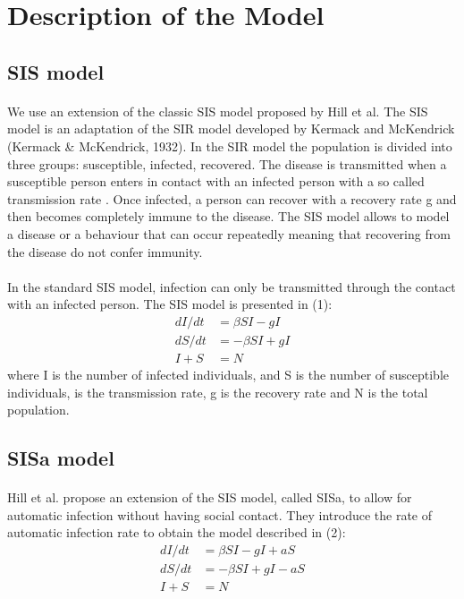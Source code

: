 \documentclass[11pt]{article}
\begin{document}
\section{Description of the Model}

\subsection{SIS model}
\paragraph{}
We use an extension of the classic SIS model proposed by Hill et al. The SIS model is an adaptation of the SIR model developed by Kermack and McKendrick (Kermack \& McKendrick, 1932). In the SIR model the population is divided into three groups: susceptible, infected, recovered. The disease is transmitted when a susceptible person enters in contact with an infected person with a so called transmission rate \beta \]. Once infected, a person can recover with a recovery rate g and then becomes completely immune to the disease. The SIS model allows to model a disease or a behaviour that can occur repeatedly meaning that recovering from the disease do not confer immunity.

\paragraph{}

In the standard SIS model, infection can only be transmitted through the contact with an infected person. The SIS model is presented in (1):
\begin{align}
      dI/dt  & =  \beta SI-gI \nonumber\\
      dS/dt   & =  -\beta SI+gI \\ 
      I+S & =  N \nonumber
\end{align}
where I is the number of infected individuals, and S is the number of susceptible individuals, \beta \] is the transmission rate, g is the recovery rate and N is the total population. 

\subsection{SISa model}
\paragraph{}
Hill et al. propose an extension of the SIS model, called SISa, to allow for automatic infection without having social contact. They introduce the rate of automatic infection rate  to obtain the model described in (2):
\begin{align}
      dI/dt  & =  \beta SI-gI+aS \nonumber\\
      dS/dt   & =  -\beta SI+gI-aS \\
      I+S & =  N \nonumber
\end{align}
\end{document}
